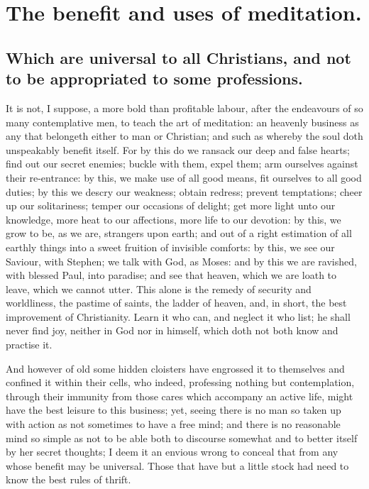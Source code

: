 \chapter{The benefit and uses of meditation.}
\section{Which are universal to all Christians, and not to be appropriated to some professions.}

It is not, I suppose, a more bold than profitable labour, after the endeavours of so many contemplative men, to teach the art of meditation: an heavenly business as any that belongeth either to man or Christian; and such as whereby the soul doth unspeakably benefit itself. For by this do we ransack our deep and false hearts; find out our secret enemies; buckle with them, expel them; arm ourselves against their re-entrance: by this, we make use of all good means, fit ourselves to all good duties; by this we descry our weakness; obtain redress; prevent temptations; cheer up our solitariness; temper our occasions of delight; get more light unto our knowledge, more heat to our affections, more life to our devotion: by this, we grow to be, as we are, strangers upon earth; and out of a right estimation of all earthly things into a sweet fruition of invisible comforts: by this, we see our Saviour, with Stephen; we talk with God, as Moses: and by this we are ravished, with blessed Paul, into paradise; and see that heaven, which we are loath to leave, which we cannot utter. This alone is the remedy of security and worldliness, the pastime of saints, the ladder of heaven, and, in short, the best improvement of Christianity. Learn it who can, and neglect it who list; he shall never find joy, neither in God nor in himself, which doth not both know and practise it. 

And however of old some hidden cloisters have engrossed it to themselves and confined it within their cells, who indeed, professing nothing but contemplation, through their immunity from those cares which accompany an active life, might have the best leisure to this business; yet, seeing there is no man so taken up with action as not sometimes to have a free mind; and there is no reasonable mind so simple as not to be able both to discourse somewhat and to better itself by her secret thoughts; I deem it an envious wrong to conceal that from any whose benefit may be universal. Those that have but a little stock had need to know the best rules of thrift. 


